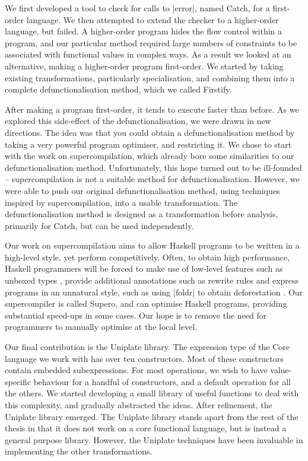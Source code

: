 We first developed a tool to check for calls to |error|, named Catch, for a first-order language. We then attempted to extend the checker to a higher-order language, but failed. A higher-order program hides the flow control within a program, and our particular method required large numbers of constraints to be associated with functional values in complex ways. As a result we looked at an alternative, making a higher-order program first-order. We started by taking existing transformations, particularly specialisation, and combining them into a complete defunctionalisation method, which we called Firstify.

After making a program first-order, it tends to execute faster than before. As we explored this side-effect of the defunctionalisation, we were drawn in new directions. The idea was that you could obtain a defunctionalisation method by taking a very powerful program optimiser, and restricting it. We chose to start with the work on supercompilation, which already bore some similarities to our defunctionalisation  method. Unfortunately, this hope turned out to be ill-founded -- supercompilation is not a suitable method for defunctionalisation. However, we were able to push our original defunctionalisation method, using techniques inspired by supercompilation, into a usable transformation. The defunctionalisation method is designed as a transformation before analysis, primarily for Catch, but can be used independently.

Our work on supercompilation aims to allow Haskell programs to be written in a high-level style, yet perform competitively. Often, to obtain high performance, Haskell programmers will be forced to make use of low-level features such as unboxed types \cite{spj:unboxing}, provide additional annotations such as rewrite rules \cite{spj:rules} and express programs in an unnatural style, such as using |foldr| to obtain deforestation \cite{gill:shortcut_deforestation}. Our supercompiler is called Supero, and can optimise Haskell programs, providing substantial speed-ups in some cases. Our hope is to remove the need for programmers to manually optimise at the local level.

Our final contribution is the Uniplate library. The expression type of the Core language we work with has over ten constructors. Most of these constructors contain embedded subexpressions. For most operations, we wish to have value-specific behaviour for a handful of constructors, and a default operation for all the others. We started developing a small library of useful functions to deal with this complexity, and gradually abstracted the ideas. After refinement, the Uniplate library emerged. The Uniplate library stands apart from the rest of the thesis in that it does not work on a core functional language, but is instead a general purpose library. However, the Uniplate techniques have been invaluable in implementing the other transformations.


